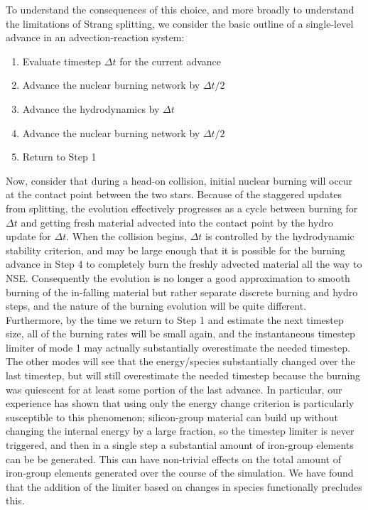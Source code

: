 \documentclass[twocolumn,numberedappendix]{../aastex6}
\begin{document}
To understand the consequences of this choice, and more broadly to 
understand the limitations of Strang splitting, we consider the 
basic outline of a single-level advance in an advection-reaction system:
\begin{enumerate}
  \item Evaluate timestep $\Delta t$ for the current advance
  \item Advance the nuclear burning network by $\Delta t / 2$
  \item Advance the hydrodynamics by $\Delta t$
  \item Advance the nuclear burning network by $\Delta t / 2$
  \item Return to Step 1
\end{enumerate}
Now, consider that during a head-on collision, initial nuclear burning 
will occur at the contact point between the two stars. Because of 
the staggered updates from splitting, the evolution effectively progresses 
as a cycle between burning for $\Delta t$ and getting fresh material 
advected into the contact point by the hydro update for $\Delta t$. 
When the collision begins, $\Delta t$ is controlled by the hydrodynamic 
stability criterion, and may be large enough that it is possible for 
the burning advance in Step 4 to completely burn the freshly advected 
material all the way to NSE. Consequently the evolution is no longer 
a good approximation to smooth burning of the in-falling material but
rather separate discrete burning and hydro steps, and the nature of 
the burning evolution will be quite different. Furthermore, by the 
time we return to Step 1 and estimate the next timestep size, all 
of the burning rates will be small again, and the instantaneous 
timestep limiter of mode 1 may actually substantially overestimate 
the needed timestep. The other modes will see that the energy/species  
substantially changed over the last timestep, but will still 
overestimate the needed timestep because the burning was quiescent
for at least some portion of the last advance. In particular, our 
experience has shown that using only the energy change criterion
is particularly susceptible to this phenomenon; silicon-group 
material can build up without changing the internal energy by a 
large fraction, so the timestep limiter is never triggered, and 
then in a single step a substantial amount of iron-group elements 
can be be generated. This can have non-trivial effects on the 
total amount of iron-group elements generated over the course of
the simulation. We have found that the addition of the 
limiter based on changes in species functionally precludes this.
\end{document}
